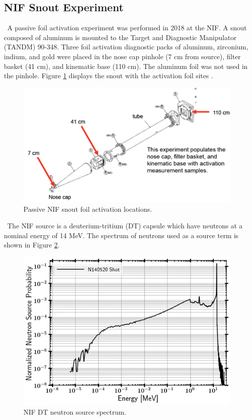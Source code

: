 \documentclass[journal]{IEEEtran}
\let\MYoriglatexcaption\caption
\renewcommand{\caption}[2][\relax]{\MYoriglatexcaption[#2]{#2}}
\begin{document}
	\subsection{NIF Snout Experiment}
	
	\ A passive foil activation experiment was performed in 2018 at the NIF. A snout composed of aluminum is mounted to the Target and Diagnostic Manipulator (TANDM) 90-348. Three foil activation diagnostic packs of aluminum, zirconium, indium, and gold were placed in the nose cap pinhole (7 cm from source), filter basket (41 cm), and kinematic base (110 cm). The aluminum foil was not used in the pinhole. Figure \ref{fig:NIF} displays the snout with the activation foil sites \cite{Bogetic}. 
	
	\begin{figure}[h!]
		\includegraphics[width=\linewidth]{Figures/NIF.png}
		\caption{Passive NIF snout foil activation locations.}
		\label{fig:NIF}
	\end{figure}
	
	\ The NIF source is a deuterium-tritium (DT) capsule which have neutrons at a nominal energy of 14 MeV. The spectrum of neutrons used as a source term is shown in Figure \ref{fig:NIFSRC}. 
	
	\begin{figure}[h!]
		\includegraphics[width=\linewidth]{Figures/NIFSRC.png}
		\caption{NIF DT neutron source spectrum.}
		\label{fig:NIFSRC}
	\end{figure}
	
\end{document}
